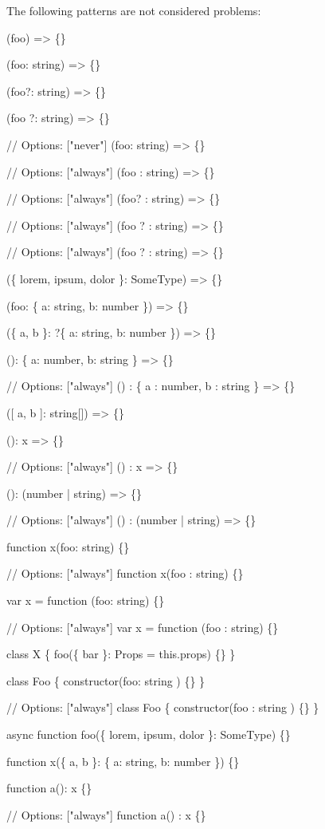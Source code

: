 The following patterns are not considered problems\+:


\begin{DoxyCode}
(foo) => \{\}

(foo: string) => \{\}

(foo?: string) => \{\}

(foo ?: string) => \{\}

// Options: ["never"]
(foo: string) => \{\}

// Options: ["always"]
(foo : string) => \{\}

// Options: ["always"]
(foo? : string) => \{\}

// Options: ["always"]
(foo ? : string) => \{\}

// Options: ["always"]
(foo  ? : string) => \{\}

(\{ lorem, ipsum, dolor \}: SomeType) => \{\}

(foo: \{ a: string, b: number \}) => \{\}

(\{ a, b \}: ?\{ a: string, b: number \}) => \{\}

(): \{ a: number, b: string \} => \{\}

// Options: ["always"]
() : \{ a : number, b : string \} => \{\}

([ a, b ]: string[]) => \{\}

(): x => \{\}

// Options: ["always"]
() : x => \{\}

(): (number | string) => \{\}

// Options: ["always"]
() : (number | string) => \{\}

function x(foo: string) \{\}

// Options: ["always"]
function x(foo : string) \{\}

var x = function (foo: string) \{\}

// Options: ["always"]
var x = function (foo : string) \{\}

class X \{ foo(\{ bar \}: Props = this.props) \{\} \}

class Foo \{ constructor(foo: string ) \{\} \}

// Options: ["always"]
class Foo \{ constructor(foo : string ) \{\} \}

async function foo(\{ lorem, ipsum, dolor \}: SomeType) \{\}

function x(\{ a, b \}: \{ a: string, b: number \}) \{\}

function a(): x \{\}

// Options: ["always"]
function a() : x \{\}


\end{DoxyCode}
